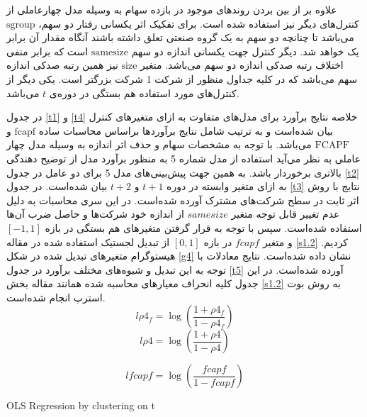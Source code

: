 \documentclass[12pt]{article}
\begin{document}
\FloatBarrier
علاوه بر از بین بردن روند‌های موجود در بازده سهام به وسیله مدل چهارعاملی از کنترل‌های دیگر نیز استفاده شده است.  برای تفکیک اثر یکسانی رفتار دو سهم، 
$ \text{sgroup} $
می‌باشد تا چنانچه دو سهم به یک گروه صنعتی تعلق داشته باشند آنگاه مقدار آن برابر یک خواهد شد. دیگر کنترل جهت یکسانی اندازه دو سهم 
$ \text{samesize} $
است که برابر منفی اختلاف رتبه صدکی اندازه دو سهم می‌باشد. متغیر 
$ \text{size} $ 
نیز همین رتبه صدکی اندازه سهم می‌باشد که در کلیه جداول منظور از 
شرکت 1 شرکت بزرگتر است. یکی دیگر از کنترل‌های مورد استفاده هم بستگی در دوره‌ی $ t $ می‌باشد.

در جدول
\ref{t1} 
و
\ref{t4}
خلاصه نتایج برآورد برای مدل‌های متفاوت به ازای متغیر‌های کنترل بیان شده‌است و به ترتیب شامل نتایج  برآورد‌ها براساس محاسبات ساده 
$ \text{fcapf} $
 و
 $ \text{FCAPF} $ 
 می‌باشد. 
 با توجه به مشخصات سهام و حذف اثر اندازه به وسیله مدل چهار عاملی به نظر می‌آید استفاده از مدل شماره 5 به منظور برآورد مدل از توضیح دهندگی بالاتری برخوردار باشد. به همین جهت پیش‌بینی‌های مدل 5 برای دو عامل در جدول
 \ref{t2} 
 به ازای متغیر وابسته در دوره
  $ t+1 $
  و
  $ t+2 $
  بیان شده‌است.
  در جدول 
  \ref{t3}
  نتایج با روش اثر ثابت در سطح شرکت‌های مشترک آورده شده‌است. در این سری محاسبات به دلیل عدم تغییر قابل توجه متغیر 
  $ samesize $
  از اندازه خود شرکت‌ها و حاصل ضرب آن‌ها استفاده شده‌است. سپس با توجه به قرار گرفتن متغیر‌های هم بستگی در بازه $  [-1,1] $ و متغیر $ fcapf $ در بازه $ [0,1] $  از تبدیل لجستیک استفاده شده در مقاله 
  \ref{s1.2}
   کردیم. هیستوگرام متغیر‌های تبدیل شده در شکل 
   \ref{g4}
   نشان داده شده‌است. نتایج معادلات با توجه به این تبدیل  و شیوه‌های مختلف برآورد در جدول 
   \ref{t5}
   آورده شده‌است. در این جدول کلیه انحراف معیار‌های محاسبه شده همانند مقاله بخش
 \ref{s1.2}
  به روش بوت استرپ انجام شده‌است.
\begin{equation}
 l\rho4_f = \log(\frac{1+ \rho4_f}{1-\rho4_f})
\end{equation}  
  \begin{equation}
   l\rho4 = \log(\frac{1+ \rho4}{1-\rho4})
  \end{equation}
 
   \begin{equation}
    lfcapf = \log(\frac{fcapf}{1-fcapf})
   \end{equation}  
 


\begin{LTR}
\begin{table}[htbp]
\centering

\caption{OLS Regression by clustering on t   }
\label{t1}
\end{table}
\end{LTR}
\end{document}

